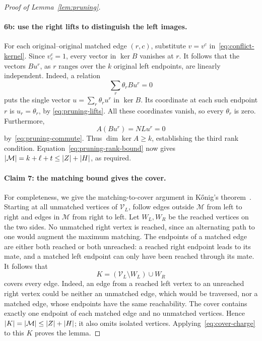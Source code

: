 \begin{proof}[Proof of Lemma~\ref{lem:pruning}]
\paragraph{6b: use the right lifts to distinguish the left images.}
For each original--original matched edge $(r,c)$, substitute $v=v^c$
in~\eqref{eq:conflict-kernel}.  Since $v^c_c=1$, every vector in
$\ker B$ vanishes at $r$.  It follows that the vectors $Bu^r$, as $r$
ranges over the $k$ original left endpoints, are linearly independent.
Indeed, a relation
\[
 \sum_r\theta_r Bu^r=0
\]
puts the single vector $u=\sum_r\theta_r u^r$ in $\ker B$.
Its coordinate at each such endpoint $r$ is $u_r=\theta_r$, by
\eqref{eq:pruning-lifts}.  All these coordinates vanish, so every
$\theta_r$ is zero.  Furthermore,
\[
 A(Bu^r)=NLu^r=0
\]
by~\eqref{eq:pruning-commute}. Thus $\dim\ker A\geq k$, establishing
the third rank condition. Equation~\eqref{eq:pruning-rank-bound} now gives
$\lvert \mathcal M\rvert=k+\ell+t\leq\lvert Z\rvert+\lvert H\rvert$, as required.

\paragraph{Claim 7: the matching bound gives the cover.}
For completeness, we give the matching-to-cover argument in
K\H{o}nig's theorem~\cite{konig1931}.  Starting at all unmatched vertices
of $\mathcal V_L$, follow edges outside $\mathcal M$ from left to
right and edges in $\mathcal M$ from right to left.  Let $W_L,W_R$
be the reached vertices on the two sides.  No unmatched right vertex
is reached, since an alternating path to one would augment the maximum
matching.  The endpoints of a matched edge are either both reached or
both unreached: a reached right endpoint leads to its mate, and a
matched left endpoint can only have been reached through its mate.
It follows that
\[
 K=(\mathcal V_L\setminus W_L)\cup W_R
\]
covers every edge.  Indeed, an edge from a reached left vertex to an
unreached right vertex could be neither an unmatched edge, which would
be traversed, nor a matched edge, whose endpoints have the same
reachability.  The cover contains exactly one endpoint of each matched
edge and no unmatched vertices.  Hence
$\lvert K\rvert=\lvert \mathcal M\rvert\leq\lvert Z\rvert+\lvert H\rvert$; it also omits isolated
vertices.  Applying~\eqref{eq:cover-charge} to this $K$ proves the lemma.
\end{proof}
